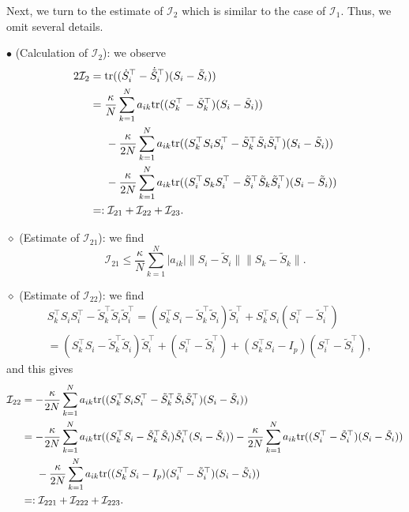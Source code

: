 \documentclass[11pt,reqno]{amsart}
\numberwithin{figure}{section}
\newcommand{\kp}{\kappa}
\newcommand{\tr}{{\textup{tr}}}
\begin{document}
Next, we turn to the estimate of $\mathcal I_2$ which is similar to the case of $\mathcal I_1$.  Thus, we omit several details. 

\noindent $\bullet$ (Calculation of $\mathcal I_2$): we observe
\begin{align*}
 2\mathcal I_2 & = \tr (( \dot S_i^\top - \dot{ \tilde S}_i^\top) (S_i - \tilde S_i)) \\
& = \frac{\kp}{N} \sum_{k=1}^N a_{ik} \tr(( S_k^\top - \tilde S_k^\top)(S_i - \tilde S_i)) \\
& \hspace{0.5cm} -\frac{\kp}{2N} \sum_{k=1}^N a_{ik} \tr(( S_k^\top S_i S_i^\top - \tilde S_k^\top \tilde S_i \tilde S_i^\top)(S_i - \tilde S_i)) \\
& \hspace{0.5cm} -\frac{\kp}{2N} \sum_{k=1}^N a_{ik} \tr(( S_i^\top S_k S_i^\top - \tilde S_i^\top \tilde S_k \tilde S_i^\top)(S_i - \tilde S_i))  \\
 & =: \mathcal I_{21}  + \mathcal I_{22} + \mathcal I_{23} .
\end{align*}

$\diamond$ (Estimate of $\mathcal I_{21}$): we find
\[
\mathcal I_{21} \leq \frac\kp N \sum_{k=1}^N |a_{ik}| \|S_i - \tilde S_i \|  \|S_k - \tilde S_k\| .
\]

$\diamond$ (Estimate of $\mathcal I_{22}$): we find
\begin{align*}
& S_k^\top S_i S_i^\top  -  \tilde S_k^\top \tilde S_i \tilde S_i^\top = ( S_k^\top S_i - \tilde S_k^\top \tilde S_i) \tilde S_i^\top + S_k^\top S_i ( S_i^\top - \tilde S_i^\top)    \\
& = ( S_k^\top S_i - \tilde S_k^\top \tilde S_i) \tilde S_i^\top + (S_i^\top - \tilde S_i^\top ) + (S_k^\top S_i - I_p)(S_i ^\top - \tilde S_i^\top),
\end{align*} 
and this gives
\begin{align*}
\mathcal I_{22} & = -\frac{\kp}{2N} \sum_{k=1}^N a_{ik} \tr(( S_k^\top S_i S_i^\top - \tilde S_k^\top \tilde S_i \tilde S_i^\top)(S_i - \tilde S_i)) \\
& = -\frac{\kp}{2N} \sum_{k=1}^N a_{ik} \tr( ( S_k^\top S_i - \tilde S_k^\top \tilde S_i) \tilde S_i^\top ( S_i -\tilde S_i)) -\frac{\kp}{2N} \sum_{k=1}^N a_{ik} \tr(( S_i^\top -\tilde S_i^\top)(S_i - \tilde S_i)) \\
&\hspace{0.5cm}  - \frac{\kp}{2N} \sum_{k=1}^N a_{ik} \tr(( S_k^\top S_i - I_p)(S_i^\top - \tilde S_i^\top)(S_i-\tilde S_i))  \\
& =: \mathcal I_{221} + \mathcal I_{222} + \mathcal I_{223} .
\end{align*}
\end{document}
